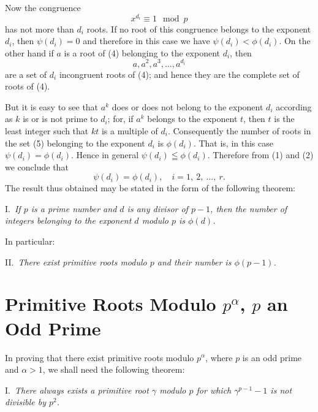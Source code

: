 \documentclass[oneside]{book}
\begin{document}
Now the congruence
\begin{equation}
x^{d_i} \equiv 1 \mod p \tag{4}
\end{equation}
has not more than $d_i$ roots. If no root of this congruence belongs
to the exponent $d_i$, then $\psi(d_i) = 0$ and therefore in this
case we have $\psi(d_i) < \phi(d_i)$. On the other hand if $a$ is a
root of (4) belonging to the exponent $d_i$, then
\begin{equation}
a, a^2, a^3, \ldots, a^{d_i} \tag{5}
\end{equation}
are a set of $d_i$ incongruent roots of (4); and hence they are the
complete set of roots of (4).

But it is easy to see that $a^k$ does or does not belong to the
exponent $d_i$ according as $k$ is or is not prime to $d_i$; for, if
$a^k$ belongs to the exponent $t$, then $t$ is the least integer
such that $kt$ is a multiple of $d_i$. Consequently the number of
roots in the set (5) belonging to the exponent $d_i$ is $\phi(d_i)$.
That is, in this case $\psi(d_i) = \phi(d_i)$. Hence in general
$\psi(d_i) \leqq \phi(d_i)$. Therefore from (1) and (2) we conclude
that
\begin{equation*}
\psi(d_i) = \phi(d_i), \quad i = 1,\ 2,\ \ldots,\ r.
\end{equation*}
The result thus obtained may be stated in the form of the following
theorem:

\smallskip I.~\emph{If $p$ is a prime number and $d$ is any divisor
of $p-1$, then the number of integers belonging to the exponent $d$
modulo $p$ is $\phi(d)$.}

In particular:

\smallskip II.~\emph{There exist primitive roots modulo $p$ and their
number is $\phi(p-1)$.}

\section{Primitive Roots Modulo $p^\alpha$, $p$ an Odd
Prime}\label{s36}

In proving that there exist primitive roots modulo $p^\alpha$, where
$p$ is an odd prime and $\alpha > 1$, we shall need the following
theorem:

I.~\emph{There always exists a primitive root $\gamma$ modulo $p$
for which $\gamma^{p-1} - 1$ is not divisible by $p^2$.}
\end{document}
